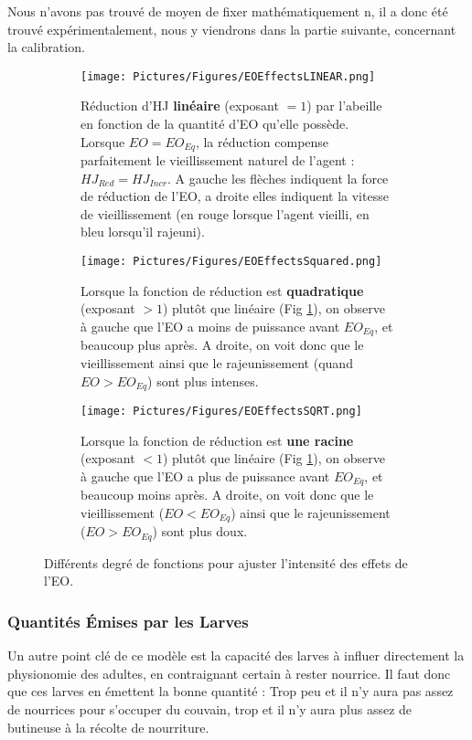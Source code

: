 \documentclass[11pt,a4paper]{report}
\begin{document}
	Nous n'avons pas trouvé de moyen de fixer mathématiquement n, il a donc été trouvé expérimentalement, nous y viendrons dans la partie suivante, concernant la calibration.
	
	\begin{figure}
	\centering
	
	\begin{subfigure}{\textwidth}
	\texttt{[image: Pictures/Figures/EOEffectsLINEAR.png]}
	\caption{Réduction d'HJ \textbf{linéaire} (exposant $= 1$) par l'abeille en fonction de la quantité d'EO qu'elle possède. Lorsque $EO = EO_{Eq}$, la réduction compense parfaitement le vieillissement naturel de l'agent : $HJ_{Red} = HJ_{Incr}$. A gauche les flèches indiquent la force de réduction de l'EO, a droite elles indiquent la vitesse de vieillissement (en rouge lorsque l'agent vieilli, en bleu lorsqu'il rajeuni).}
	\label{eoLinear}
	\end{subfigure}
	
	\begin{subfigure}{\textwidth}
	\centering
	\texttt{[image: Pictures/Figures/EOEffectsSquared.png]}
	\caption{Lorsque la fonction de réduction est \textbf{quadratique} (exposant $> 1$) plutôt que linéaire (Fig \ref{eoLinear}), on observe à gauche que l'EO a moins de puissance avant $EO_{Eq}$, et beaucoup plus après. A droite, on voit donc que le vieillissement ainsi que le rajeunissement (quand $EO > EO_{Eq}$) sont plus intenses.}
	\label{eoSquared}
	\end{subfigure}
	
	\begin{subfigure}{\textwidth}
	\centering
	\texttt{[image: Pictures/Figures/EOEffectsSQRT.png]}
	\caption{Lorsque la fonction de réduction est \textbf{une racine} (exposant $< 1$) plutôt que linéaire (Fig \ref{eoLinear}), on observe à gauche que l'EO a plus de puissance avant $EO_{Eq}$, et beaucoup moins après. A droite, on voit donc que le vieillissement ($EO < EO_{Eq}$) ainsi que le rajeunissement ($EO > EO_{Eq}$) sont plus doux.}
	\label{eoSqrt}	
	\end{subfigure}
	
	\caption{Différents degré de fonctions pour ajuster l'intensité des effets de l'EO.}	
	\label{eoAll}
	\end{figure}
	
	
	
	\subsubsection{Quantités Émises par les Larves}
	Un autre point clé de ce modèle est la capacité des larves à influer directement la physionomie des adultes, en contraignant certain à rester nourrice. Il faut donc  que ces larves en émettent la bonne quantité : Trop peu et il n'y aura pas assez de nourrices pour s'occuper du couvain, trop et il n'y aura plus assez de butineuse à la récolte de nourriture.
	
\end{document}
